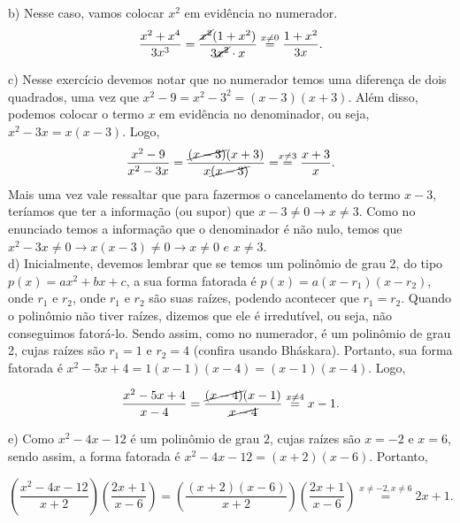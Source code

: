 b) Nesse caso, vamos colocar $x^2$ em evidência no numerador.
 $$\frac{x^2+x^4}{3x^3}= \frac{\cancel{x^2}(1+x^2)}{3\cancel{x^2}\cdot x}\stackrel{x \neq 0}{=}\frac{1+x^2}{3x}.$$

 c) Nesse exercício devemos notar que no numerador temos uma diferença de dois quadrados, uma vez que $x^2-9=x^2-3^2= (x-3)(x+3)$. Além disso, podemos colocar o termo $x$ em evidência no denominador, ou seja, $x^2-3x=x(x-3)$. Logo,
 $$\frac{x^2-9}{x^2-3x}= \frac{\cancel{(x-3)}(x+3)}{x\cancel{(x-3)}}=  \stackrel{x \neq 3}{=} \frac{x+3}{x}.$$
 Mais uma vez vale ressaltar que para fazermos o cancelamento do termo $x-3$, teríamos que ter a informação (ou supor) que $x-3 \neq 0 \to x \neq 3$. Como no enunciado temos a informação que o denominador é não nulo, temos que $x^2-3x \neq 0 \to x(x-3) \neq 0 \to x \neq 0 \,\, e \,\, x\neq 3$. \\

 d) Inicialmente, devemos lembrar que se temos um polinômio de grau 2, do tipo $p(x)= ax^2+bx+c$, a sua forma fatorada é $p(x)=a(x-r_1)(x-r_2)$, onde $r_1$ e $r_2$, onde $r_1$ e $r_2$ são suas raízes, podendo acontecer que $r_1=r_2$. Quando o polinômio não tiver raízes, dizemos que ele é irredutível, ou seja, não conseguimos fatorá-lo.
 Sendo assim, como no numerador, é um polinômio de grau 2, cujas raízes são $r_1=1$ e $r_2=4$ (confira usando Bháskara). Portanto, sua forma fatorada é $x^2-5x+4=1(x-1)(x-4)=(x-1)(x-4)$. Logo,

 $$\frac{x^2-5x+4}{x-4}=\frac{\cancel{(x-4)}(x-1)}{\cancel{x-4}}\stackrel{x \neq 4}{=} x-1. $$

 e) Como $x^2-4x-12$ é um polinômio de grau $2$, cujas raízes são $x=-2$ e $x=6$, sendo assim, a forma fatorada é $x^2-4x-12=(x+2)(x-6)$. Portanto,

 $$\left(\frac{x^2-4x-12}{x+2} \right) \left( \frac{2x+1}{x-6}\right)= \left(\frac{(x+2)(x-6)}{x+2} \right) \left( \frac{2x+1}{x-6}\right) \stackrel{x \neq -2, x \neq 6}{=}2x+1.$$



\color{black}



